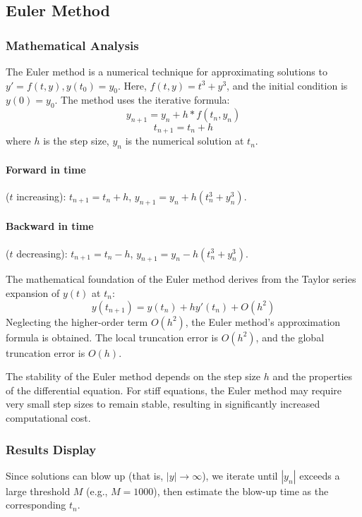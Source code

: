 \documentclass{article}
\begin{document}
\subsection{Euler Method}

\subsubsection{Mathematical Analysis}

The Euler method is a numerical technique for approximating solutions to \( y' = f(t,y) , y(t_0) = y_0\). Here, \(f(t,y) = t^3 + y^3\), and the initial condition is \(y(0) = y_0\). The method uses the iterative formula:
\[y_{n+1} = y_n + h * f(t_n , y_n)\]
\[ t_{n+1} = t_n + h \]
where \( h \) is the step size, \(y_n\) is the numerical solution at \(t_n\).  
\paragraph{Forward in time}(\( t \) increasing): \( t_{n+1} = t_n + h \), \( y_{n+1} = y_n + h (t_n^3 + y_n^3) \).
\paragraph{Backward in time}(\( t \) decreasing): \( t_{n+1} = t_n - h \), \( y_{n+1} = y_n - h (t_n^3 + y_n^3) \).

The mathematical foundation of the Euler method derives from the Taylor series expansion of \( y(t) \) at \( t_n \):
\[
y(t_{n+1}) = y(t_n) + h y'(t_n) + O(h^2)
\]
Neglecting the higher-order term \( O(h^2) \), the Euler method's approximation formula is obtained. The local truncation error is \( O(h^2) \), and the global truncation error is \( O(h) \). 

The stability of the Euler method depends on the step size \( h \) and the properties of the differential equation. For stiff equations, the Euler method may require very small step sizes to remain stable, resulting in significantly increased computational cost.





\subsubsection{Results Display}
Since solutions can blow up (that is, \( |y| \to \infty \)), we iterate until \( |y_n| \) exceeds a large threshold \( M \) (e.g., \( M = 1000 \)), then estimate the blow-up time as the corresponding \( t_n \).
\end{document}

